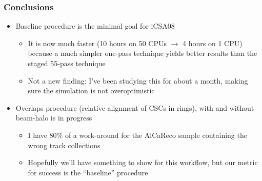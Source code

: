 \documentclass[compress]{beamer}
\begin{document}
\begin{frame}
\frametitle{Conclusions}

\begin{itemize}\setlength{\itemsep}{0.4 cm}
\item Baseline procedure is the minimal goal for iCSA08
\begin{itemize}\setlength{\itemsep}{0.2 cm}
\item It is now much faster (10 hours on 50 CPUs $\to$ 4 hours on 1
CPU) because a much simpler one-pass technique yields better results
than the staged 55-pass technique
\item Not a new finding: I've been studying this for about a month,
making sure the simulation is not overoptimistic
\end{itemize}

\item Overlaps procedure (relative alignment of CSCs in rings), with
and without beam-halo is in progress
\begin{itemize}\setlength{\itemsep}{0.2 cm}
\item I have 80\% of a work-around for the AlCaReco sample containing the wrong track collections
\item Hopefully we'll have something to show for this workflow, but
our metric for success is the ``baseline'' procedure
\end{itemize}
\end{itemize}

\label{numpages}
\end{frame}
\end{document}
